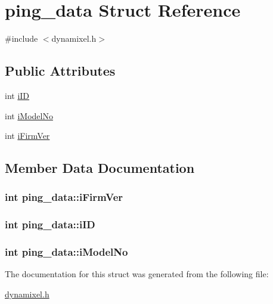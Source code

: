 \hypertarget{structping__data}{}\section{ping\+\_\+data Struct Reference}
\label{structping__data}


{\ttfamily \#include $<$dynamixel.\+h$>$}

\subsection*{Public Attributes}
\begin{DoxyCompactItemize}
\item 
int \hyperlink{structping__data_afa48124c46271b97615e464bfb0b31bc}{i\+I\+D}
\item 
int \hyperlink{structping__data_a21475c3d8b2629e66cd2c1227c648489}{i\+Model\+No}
\item 
int \hyperlink{structping__data_a4a340fb47423b484b48237ceb5b39ef4}{i\+Firm\+Ver}
\end{DoxyCompactItemize}


\subsection{Member Data Documentation}
\hypertarget{structping__data_a4a340fb47423b484b48237ceb5b39ef4}{}
\subsubsection[{i\+Firm\+Ver}]{\setlength{\rightskip}{0pt plus 5cm}int ping\+\_\+data\+::i\+Firm\+Ver}\label{structping__data_a4a340fb47423b484b48237ceb5b39ef4}
\hypertarget{structping__data_afa48124c46271b97615e464bfb0b31bc}{}
\subsubsection[{i\+I\+D}]{\setlength{\rightskip}{0pt plus 5cm}int ping\+\_\+data\+::i\+I\+D}\label{structping__data_afa48124c46271b97615e464bfb0b31bc}
\hypertarget{structping__data_a21475c3d8b2629e66cd2c1227c648489}{}
\subsubsection[{i\+Model\+No}]{\setlength{\rightskip}{0pt plus 5cm}int ping\+\_\+data\+::i\+Model\+No}\label{structping__data_a21475c3d8b2629e66cd2c1227c648489}


The documentation for this struct was generated from the following file\+:\begin{DoxyCompactItemize}
\item 
\hyperlink{dynamixel_8h}{dynamixel.\+h}\end{DoxyCompactItemize}

